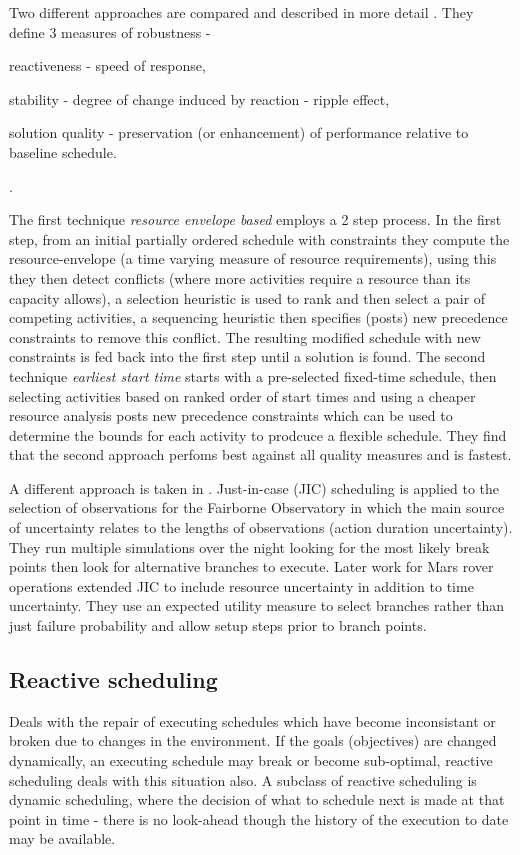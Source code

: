 \documentclass[12pt,a4paper]{article}
\begin{document}
Two different approaches are compared \citep{policella03flexible} and described in more detail \citep{policella05thesis}. 
They define 3 measures of robustness - \begin{inparaenum}\item reactiveness - speed of response, \item stability - degree of change induced by reaction - ripple effect, \item solution quality - preservation (or enhancement) of performance relative to baseline schedule.\end{inparaenum}.

The first technique \emph{resource envelope based} employs a 2 step process. 
In the first step, from an initial partially ordered schedule with constraints they compute the resource-envelope (a time varying measure of resource requirements), using this they then detect conflicts (where more activities require a resource than its capacity allows), a selection heuristic is used to rank and then select a pair of competing activities, a sequencing heuristic then specifies (posts) new precedence constraints to remove this conflict. The resulting modified schedule with new constraints is fed back into the first step until a solution is found.
The second technique \emph{earliest start time} starts with a pre-selected fixed-time schedule, then selecting activities based on ranked order of start times and using a cheaper resource analysis posts new precedence constraints which can be used to determine the bounds for each activity to prodcuce a flexible schedule. They find that the second approach perfoms best against all quality measures and is fastest.  

A different approach is taken in \citep{bresina94jic}. Just-in-case (JIC) scheduling is applied to the selection of observations for the Fairborne Observatory in which the main source of uncertainty relates to the lengths of observations (action duration uncertainty). They run multiple simulations over the night looking for the most likely break points then look for alternative branches to execute. Later work \citep{bresina99increased} for Mars rover operations extended JIC to include resource uncertainty in addition to time uncertainty. They use an expected utility measure to select branches rather than just failure probability and allow setup steps prior to branch points.

\subsection{Reactive scheduling}
\label{subsect:reactive}
Deals with the repair of executing schedules which have become inconsistant or broken due to changes in the environment. If the goals (objectives) are changed dynamically, an executing schedule may break or become sub-optimal, reactive scheduling deals with this situation also. A subclass of reactive scheduling is dynamic scheduling, where the decision of what to schedule next is made at that point in time - there is no look-ahead though the history of the execution to date may be available.
\end{document}
